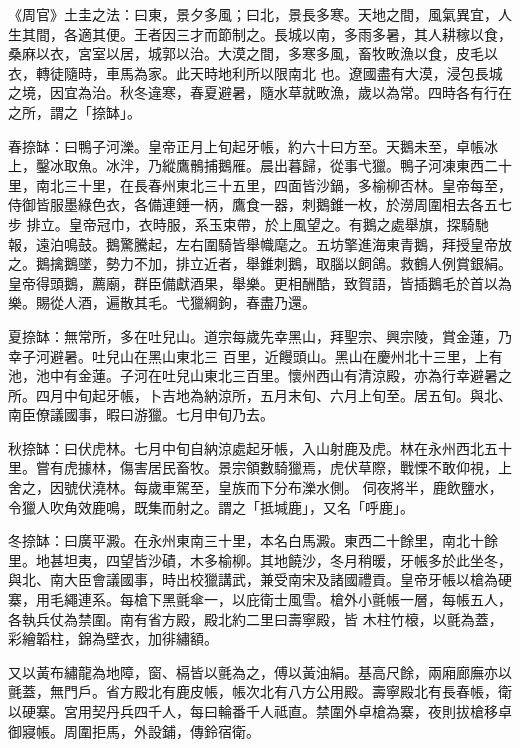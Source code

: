 
\begin{pinyinscope}

 《周官》土圭之法：曰東，景夕多風；曰北，景長多寒。天地之間，風氣異宜，人生其間，各適其便。王者因三才而節制之。長城以南，多雨多暑，其人耕稼以食，桑麻以衣，宮室以居，城郭以治。大漠之間，多寒多風，畜牧畋漁以食，皮毛以衣，轉徒隨時，車馬為家。此天時地利所以限南北
 也。遼國盡有大漠，浸包長城之境，因宜為治。秋冬違寒，春夏避暑，隨水草就畋漁，歲以為常。四時各有行在之所，謂之「捺缽」。



 春捺缽：曰鴨子河濼。皇帝正月上旬起牙帳，約六十曰方至。天鵝未至，卓帳冰上，鑿冰取魚。冰泮，乃縱鷹鶻捕鵝雁。晨出暮歸，從事弋獵。鴨子河凍東西二十里，南北三十里，在長春州東北三十五里，四面皆沙鍋，多榆柳否林。皇帝每至，侍御皆服墨綠色衣，各備連錘一柄，鷹食一器，刺鵝錐一枚，於澇周圍相去各五七步
 排立。皇帝冠巾，衣時服，系玉束帶，於上風望之。有鵝之處舉旗，探騎馳報，遠泊鳴鼓。鵝驚騰起，左右圍騎皆舉幟麾之。五坊擎進海東青鵝，拜授皇帝放之。鵝擒鵝墜，勢力不加，排立近者，舉錐刺鵝，取腦以飼鴿。救鶴人例賞銀絹。皇帝得頭鵝，薦廟，群臣備獻酒果，舉樂。更相酬酷，致賀語，皆插鵝毛於首以為樂。賜從人酒，遍散其毛。弋獵綱鉤，春盡乃還。



 夏捺缽：無常所，多在吐兒山。道宗每歲先幸黑山，拜聖宗、興宗陵，賞金蓮，乃幸子河避暑。吐兒山在黑山東北三
 百里，近饅頭山。黑山在慶州北十三里，上有池，池中有金蓮。子河在吐兒山東北三百里。懷州西山有清涼殿，亦為行幸避暑之所。四月中旬起牙帳，卜吉地為納涼所，五月末旬、六月上旬至。居五旬。與北、南臣僚議國事，暇曰游獵。七月申旬乃去。



 秋捺缽：曰伏虎林。七月中旬自納涼處起牙帳，入山射鹿及虎。林在永州西北五十里。嘗有虎據林，傷害居民畜牧。景宗領數騎獵焉，虎伏草際，戰慄不敢仰視，上舍之，因號伏澆林。每歲車駕至，皇族而下分布濼水側。
 伺夜將半，鹿飲鹽水，令獵人吹角效鹿鳴，既集而射之。謂之「抵堿鹿」，又名「呼鹿」。



 冬捺缽：曰廣平澱。在永州東南三十里，本名白馬澱。東西二十餘里，南北十餘里。地甚坦夷，四望皆沙磧，木多榆柳。其地饒沙，冬月稍暖，牙帳多於此坐冬，與北、南大臣會議國事，時出校獵講武，兼受南宋及諸國禮貢。皇帝牙帳以槍為硬寨，用毛繩連系。每槍下黑氈傘一，以庇衛士風雪。槍外小氈帳一層，每帳五人，各執兵仗為禁圍。南有省方殿，殿北約二里曰壽寧殿，皆
 木柱竹榱，以氈為蓋，彩繪韜柱，錦為壁衣，加徘繡額。



 又以黃布繡龍為地障，窗、槅皆以氈為之，傅以黃油絹。基高尺餘，兩廂廊廡亦以氈蓋，無門戶。省方殿北有鹿皮帳，帳次北有八方公用殿。壽寧殿北有長春帳，衛以硬寨。宮用契丹兵四千人，每曰輪番千人祗直。禁圍外卓槍為寨，夜則拔槍移卓御寢帳。周圍拒馬，外設鋪，傳鈴宿衛。




\end{pinyinscope}
